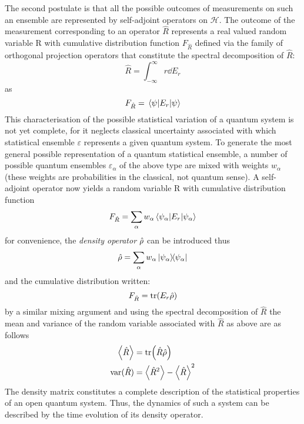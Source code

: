 The second postulate is that all the possible outcomes of measurements on such an ensemble are represented by self-adjoint operators on $\mathcal{H}$.
The outcome of the measurement corresponding to an operator $\hat{R}$ represents a real valued random variable R with cumulative distribution function $F_{\hat{R}}$ defined via the family of orthogonal projection operators that constitute the spectral decomposition of $\hat{R}$:
\begin{equation}
  \hat{R} = \int_{-\infty}^\infty r \dd{E_r}
\end{equation}
as
\begin{equation}
  F_{\hat{R}} = \expval{E_r}{\psi}
\end{equation}
This characterisation of the possible statistical variation of a quantum system is not yet complete, for it neglects classical uncertainty associated with which statistical ensemble $\varepsilon$ represents a given quantum system.
To generate the most general possible representation of a quantum statistical ensemble, a number of possible quantum ensembles $\varepsilon_\alpha$ of the above type are mixed with weights $w_\alpha$ (these weights are probabilities in the classical, not quantum sense).
A self-adjoint operator now yields a random variable R with cumulative distribution function
\begin{equation}
  F_{\hat{R}} = \sum_\alpha w_\alpha \expval{E_r}{\psi_\alpha} 
\end{equation}
for convenience, the \emph{density operator} $\hat{\rho}$ can be introduced thus
\begin{equation}
  \hat{\rho} = \sum_\alpha w_\alpha \ketbra{\psi_\alpha}{\psi_\alpha}
\end{equation}
and the cumulative distribution written:
\begin{equation}
  F_{\hat{R}} = \tr(E_r \hat{\rho})
\end{equation}
by a similar mixing argument and using the spectral decomposition of $\hat{R}$ the mean and variance of the random variable associated with $\hat{R}$ as above are as follows
\begin{align}
       \ev{\hat{R}} &= \tr(\hat{R} \dens ) \\
\text{var}(\hat{R}) &= \ev{\hat{R}^2} - {\ev{\hat{R}}}^2
\end{align}
The density matrix constitutes a complete description of the statistical properties of an open quantum system.
Thus, the dynamics of such a system can be described by the time evolution of its density operator.

